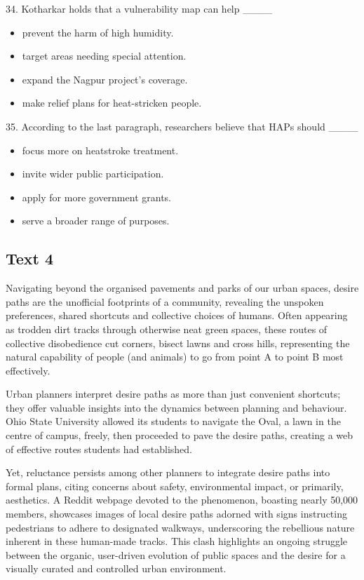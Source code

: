 \documentclass[UTF8,11pt]{ctexart}
\begin{document}
34. Kotharkar holds that a vulnerability map can help \_\_\_\_


\begin{itemize}[leftmargin=2em,itemsep=.2em,topsep=.4em]\item[A.] prevent the harm of high humidity.
\item[B.] target areas needing special attention.
\item[C.] expand the Nagpur project’s coverage.
\item[D.] make relief plans for heat-stricken people.
\end{itemize}

35. According to the last paragraph, researchers believe that HAPs should \_\_\_\_


\begin{itemize}[leftmargin=2em,itemsep=.2em,topsep=.4em]\item[A.] focus more on heatstroke treatment.
\item[B.] invite wider public participation.
\item[C.] apply for more government grants.
\item[D.] serve a broader range of purposes.
\end{itemize}

\subsection*{\textbf{Text 4}}


Navigating beyond the organised pavements and parks of our urban spaces, desire paths are the unofficial footprints of a community, revealing the unspoken preferences, shared shortcuts and collective choices of humans. Often appearing as trodden dirt tracks through otherwise neat green spaces, these routes of collective disobedience cut corners, bisect lawns and cross hills, representing the natural capability of people (and animals) to go from point A to point B most effectively.


Urban planners interpret desire paths as more than just convenient shortcuts; they offer valuable insights into the dynamics between planning and behaviour. Ohio State University allowed its students to navigate the Oval, a lawn in the centre of campus, freely, then proceeded to pave the desire paths, creating a web of effective routes students had established.


Yet, reluctance persists among other planners to integrate desire paths into formal plans, citing concerns about safety, environmental impact, or primarily, aesthetics. A Reddit webpage devoted to the phenomenon, boasting nearly 50,000 members, showcases images of local desire paths adorned with signs instructing pedestrians to adhere to designated walkways, underscoring the rebellious nature inherent in these human-made tracks. This clash highlights an ongoing struggle between the organic, user-driven evolution of public spaces and the desire for a visually curated and controlled urban environment.
\end{document}
